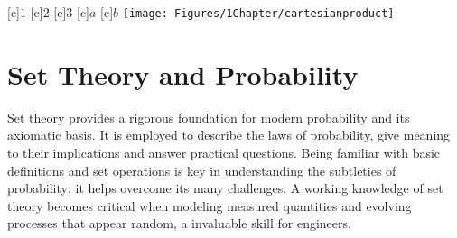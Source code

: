 \begin{center}
\begin{psfrags}
[c]{$1$}
[c]{$2$}
[c]{$3$}
[c]{$a$}
[c]{$b$}
\texttt{[image: Figures/1Chapter/cartesianproduct]}
\end{psfrags}
\end{center}


\section{Set Theory and Probability}

Set theory provides a rigorous foundation for modern probability and its axiomatic basis.
It is employed to describe the laws of probability, give meaning to their implications and answer practical questions.
Being familiar with basic definitions and set operations is key in understanding the subtleties of probability; it helps overcome its many challenges.
A working knowledge of set theory becomes critical when modeling measured quantities and evolving processes that appear random, a invaluable skill for engineers.

